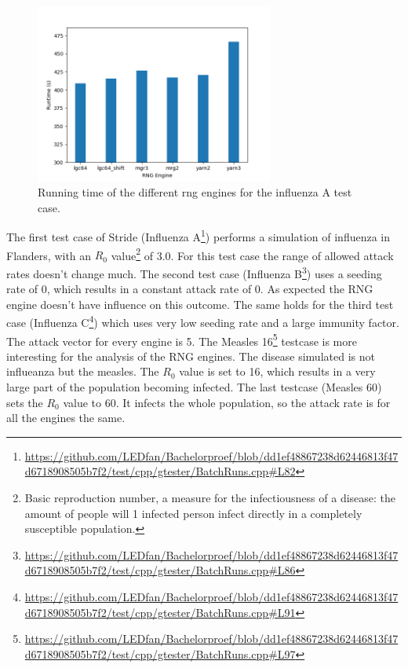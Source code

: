 \documentclass{acmart}
\begin{document}
\begin{figure}
    \centering
    \includegraphics[width=0.7\textwidth]{images/engine_performance_bar.png}
    \caption{Running time of the different rng engines for the influenza A test case.}
    \label{fig:engine:running}
\end{figure}


The first test case of Stride (Influenza A\footnote{\url{https://github.com/LEDfan/Bachelorproef/blob/dd1ef48867238d62446813f47d6718908505b7f2/test/cpp/gtester/BatchRuns.cpp\#L82}})
performs a simulation of influenza in Flanders, with an $R_0$ value\footnote{Basic reproduction number, a measure for the infectiousness of a disease: the amount of people will 1 infected person infect directly in a completely
susceptible population.} of 3.0. For this test case the range of allowed attack rates doesn't change much. 
The second test case (Influenza B\footnote{\url{https://github.com/LEDfan/Bachelorproef/blob/dd1ef48867238d62446813f47d6718908505b7f2/test/cpp/gtester/BatchRuns.cpp\#L86}}) uses a seeding rate of 0, which results in a constant attack rate of 0. As expected the RNG engine doesn't have influence on this outcome.
The same holds for the third test case (Influenza C\footnote{\url{https://github.com/LEDfan/Bachelorproef/blob/dd1ef48867238d62446813f47d6718908505b7f2/test/cpp/gtester/BatchRuns.cpp\#L91}}) which uses very low seeding rate and a large immunity factor. The attack vector for every engine is 5.
The Measles 16\footnote{\url{https://github.com/LEDfan/Bachelorproef/blob/dd1ef48867238d62446813f47d6718908505b7f2/test/cpp/gtester/BatchRuns.cpp\#L97}} testcase is more interesting for the analysis of the RNG engines. The disease simulated is not influeanza but the measles. The $R_0$ value is set to 16, which results in a very large part of the population becoming infected.
The last testcase (Measles 60) sets the $R_0$ value to 60. It infects the whole population, so the attack rate is for all the engines the same.
    
\end{document}
